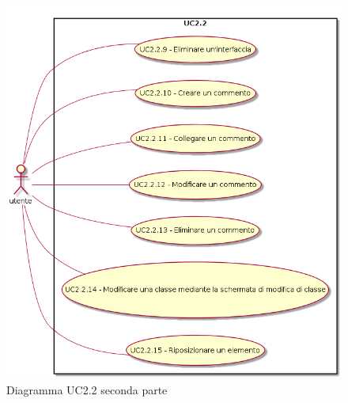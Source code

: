 \documentclass[../AnalisiDeiRequisiti.tex]{subfiles}
\begin{document}
	\begin{figure} [H]
		\centering
		\includegraphics[scale=0.45]{./Figures/UC2-2parte2.png}
		\caption{Diagramma UC2.2 seconda parte}\label{}
	\end{figure}
\end{document}

